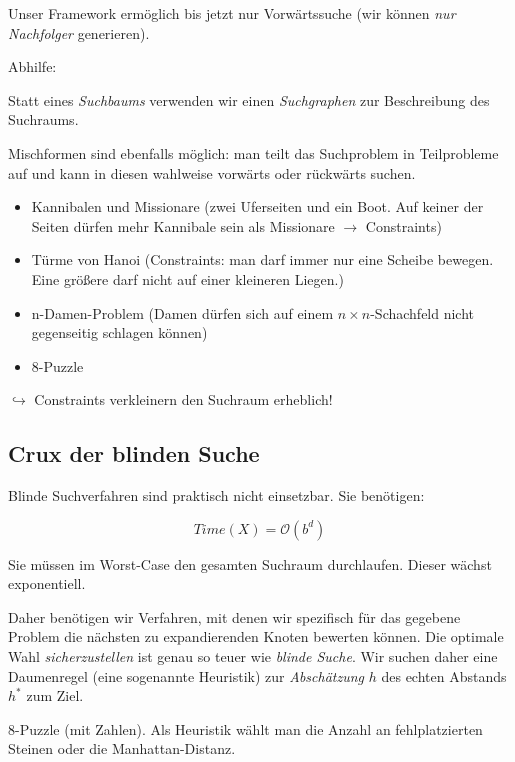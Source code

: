 \documentclass[runningheads,deutsch]{llncs}
\newenvironment{indentleft}[1]{
    \setlength{\leftskip}{#1}
}{
    \setlength{\leftskip}{0pt}
}
\begin{document}
Unser Framework ermöglich bis jetzt nur Vorwärtssuche (wir können \textit{nur Nachfolger} generieren).

Abhilfe:
\\
\begin{indentleft}{1cm}
    Statt eines \textit{Suchbaums} verwenden wir einen \textit{Suchgraphen} zur Beschreibung des Suchraums.
\end{indentleft}

Mischformen sind ebenfalls möglich: man teilt das Suchproblem in Teilprobleme auf und kann in diesen wahlweise vorwärts oder rückwärts suchen.

\begin{example}
    \begin{itemize}
        \item Kannibalen und Missionare (zwei Uferseiten und ein Boot. Auf keiner der Seiten dürfen mehr Kannibale sein als Missionare $\rightarrow$ Constraints)
    \item Türme von Hanoi (Constraints: man darf immer nur eine Scheibe bewegen. Eine größere darf nicht auf einer kleineren Liegen.)
    \item n-Damen-Problem (Damen dürfen sich auf einem $n\times n$-Schachfeld nicht gegenseitig schlagen können)
    \item 8-Puzzle
    \end{itemize}
\end{example}

$\hookrightarrow$ Constraints verkleinern den Suchraum erheblich!

\subsection{Crux der blinden Suche}

Blinde Suchverfahren sind praktisch nicht einsetzbar. Sie benötigen:

\[ Time(X) = \mathcal O(b^d) \]

Sie müssen im Worst-Case den gesamten Suchraum durchlaufen. Dieser wächst exponentiell.

Daher benötigen wir Verfahren, mit denen wir spezifisch für das gegebene Problem die nächsten zu expandierenden Knoten bewerten können. Die optimale Wahl \textit{sicherzustellen} ist genau so teuer wie \textit{blinde Suche}. Wir suchen daher eine Daumenregel (eine sogenannte Heuristik) zur \textit{Abschätzung} $h$ des echten Abstands $h^*$ zum Ziel.

\begin{example}
    8-Puzzle (mit Zahlen). Als Heuristik wählt man die Anzahl an fehlplatzierten Steinen oder die Manhattan-Distanz.
\end{example}
\end{document}
